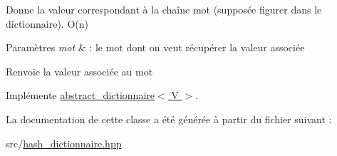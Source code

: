 Donne la valeur correspondant à la chaîne mot (supposée figurer dans le dictionnaire). O(n) 


\begin{DoxyParams}{Paramètres}
{\em mot} & \-: le mot dont on veut récupérer la valeur associée \\
\hline
\end{DoxyParams}
\begin{DoxyReturn}{Renvoie}
la valeur associée au mot 
\end{DoxyReturn}


Implémente \hyperlink{classabstract__dictionnaire_abf2426d66e5499582dc4dc4fe5eeb1c3}{abstract\-\_\-dictionnaire$<$ V $>$}.



La documentation de cette classe a été générée à partir du fichier suivant \-:\begin{DoxyCompactItemize}
\item 
src/\hyperlink{hash__dictionnaire_8hpp}{hash\-\_\-dictionnaire.\-hpp}\end{DoxyCompactItemize}

